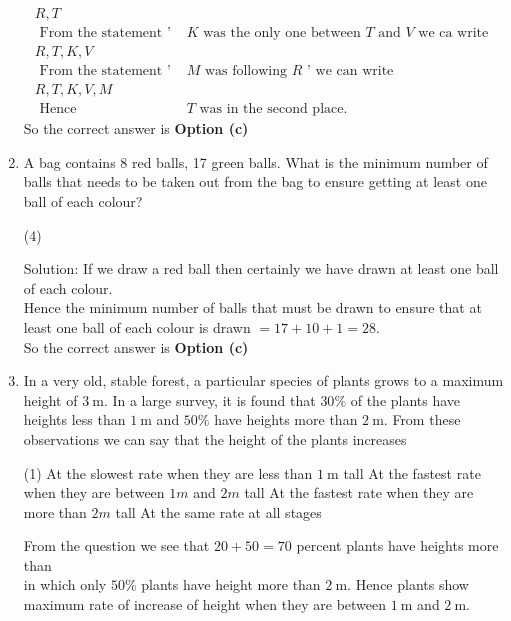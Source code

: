 \begin{enumerate}
\begin{answer}
\begin{align*}
	R,T\\
	\text { From the statement ' } &K \text { was the only one between } T \text { and } V \text { we ca write }\\
	R,T,K,V\\
	\text { From the statement ' } &M \text { was following } R \text { ' we can write }\\
	R,T,K,V,M\\
	\text { Hence } &T \text { was in the second place. }
	\end{align*}
	So the correct answer is \textbf{Option (c)}
\end{answer}
\item  A bag contains 8 red balls, 17 green balls. What is the minimum number of balls that needs to be taken out from the bag to ensure getting at least one ball of each colour?
	 \begin{tasks}(4)
	\end{tasks}
\begin{answer}
Solution: If we draw a red ball then certainly we have drawn at least one ball of each colour.\\
Hence the minimum number of balls that must be drawn to ensure that at least one ball of each colour is drawn $=17+10+1=28$.\\
		So the correct answer is \textbf{Option (c)}
\end{answer}
\item  In a very old, stable forest, a particular species of plants grows to a maximum height of $3 \mathrm{~m}$. In a large survey, it is found that $30 \%$ of the plants have heights less than $1 \mathrm{~m}$ and $50 \%$ have heights more than $2 \mathrm{~m}$. From these observations we can say that the height of the plants increases
	 \begin{tasks}(1)
		\task[\textbf{a.}] At the slowest rate when they are less than $1 \mathrm{~m}$ tall
		\task[\textbf{b.}]At the fastest rate when they are between $1 m$ and $2 m$ tall
		\task[\textbf{c.}]At the fastest rate when they are more than $2 m$ tall
		\task[\textbf{d.}]  At the same rate at all stages
	\end{tasks}
\begin{answer}
From the question we see that $20+50=70$ percent plants have heights more than\\
in which only $50 \%$ plants have height more than $2 \mathrm{~m}$. Hence plants show maximum rate of increase of height when they are between $1 \mathrm{~m}$ and $2 \mathrm{~m}$.\\

\end{answer}
\end{enumerate}
